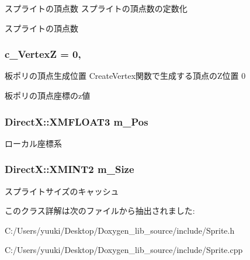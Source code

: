 スプライトの頂点数  スプライトの頂点数の定数化 

スプライトの頂点数 
\subsubsection[{\texorpdfstring{c\+\_\+\+VertexZ}{c_VertexZ}}]{\setlength{\rightskip}{0pt plus 5cm}c\+\_\+\+VertexZ = 0\hspace{0.3cm}{\ttfamily [static]}, {\ttfamily [private]}}\hypertarget{class_a_p_i_1_1_sprite_a9c8bd1ba9b75570d1ad44479a342fedc}{}\label{class_a_p_i_1_1_sprite_a9c8bd1ba9b75570d1ad44479a342fedc}


板ポリの頂点生成位置  Create\+Vertex関数で生成する頂点の\+Z位置  0 

板ポリの頂点座標のz値 
\subsubsection[{\texorpdfstring{m\+\_\+\+Pos}{m_Pos}}]{\setlength{\rightskip}{0pt plus 5cm}Direct\+X\+::\+X\+M\+F\+L\+O\+A\+T3 m\+\_\+\+Pos\hspace{0.3cm}{\ttfamily [private]}}\hypertarget{class_a_p_i_1_1_sprite_ac4dfe78085ef0a056c1ec0b18bbf894b}{}\label{class_a_p_i_1_1_sprite_ac4dfe78085ef0a056c1ec0b18bbf894b}
ローカル座標系 
\subsubsection[{\texorpdfstring{m\+\_\+\+Size}{m_Size}}]{\setlength{\rightskip}{0pt plus 5cm}Direct\+X\+::\+X\+M\+I\+N\+T2 m\+\_\+\+Size\hspace{0.3cm}{\ttfamily [private]}}\hypertarget{class_a_p_i_1_1_sprite_adb6dc678fde02000203c71a186713543}{}\label{class_a_p_i_1_1_sprite_adb6dc678fde02000203c71a186713543}
スプライトサイズのキャッシュ 

このクラス詳解は次のファイルから抽出されました\+:\begin{DoxyCompactItemize}
\item 
C\+:/\+Users/yuuki/\+Desktop/\+Doxygen\+\_\+lib\+\_\+source/include/Sprite.\+h\item 
C\+:/\+Users/yuuki/\+Desktop/\+Doxygen\+\_\+lib\+\_\+source/include/Sprite.\+cpp\end{DoxyCompactItemize}

